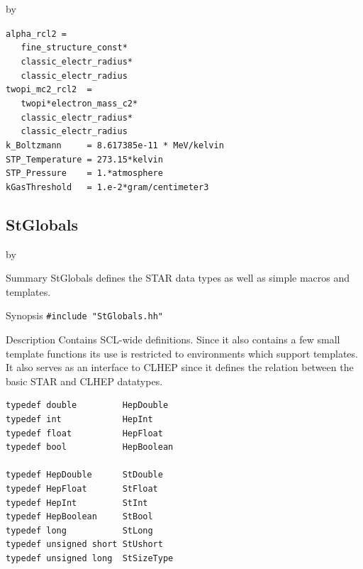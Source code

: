 \documentclass[twoside]{article}
\newcommand{\entrylabel}[1]{\mbox{\textbf{{#1}}}\hfil}%
\newenvironment{entry}
{\begin{list}{}%
    {\renewcommand{\makelabel}{\entrylabel}%
     \setlength{\labelwidth}{90pt}%
     \setlength{\leftmargin}{\labelwidth}
     \advance\leftmargin by \labelsep%
      }%
    }%
  {\end{list}}
\newcommand{\Entrylabel}[1]%
{\raisebox{0pt}[1ex][0pt]{\makebox[\labelwidth][l]%
    {\parbox[t]{\labelwidth}{\hspace{0pt}\textbf{{#1}}}}}}
\newenvironment{Entry}%
{\renewcommand{\entrylabel}{\Entrylabel}\begin{entry}}%
  {\end{entry}}
\begin{document}
\begin{description}
\begin{Entry}
  \verb+alpha_rcl2 =+ \\
  \verb+   fine_structure_const*+ \\
  \verb+   classic_electr_radius*+\\
  \verb+   classic_electr_radius+ \\ 
  \verb+twopi_mc2_rcl2  =+ \\
  \verb+   twopi*electron_mass_c2*+ \\
  \verb+   classic_electr_radius*+\\
  \verb+   classic_electr_radius+ \\
  \verb+k_Boltzmann     = 8.617385e-11 * MeV/kelvin+ \\
  \verb+STP_Temperature = 273.15*kelvin+ \\
  \verb+STP_Pressure    = 1.*atmosphere+ \\
  \verb+kGasThreshold   = 1.e-2*gram/centimeter3+ \\
\end{Entry}
\newpage

%
%

\subsection{StGlobals}
\begin{Entry}
\item[Summary]
    StGlobals defines the STAR data types as well as simple
    macros and templates.   

\item[Synopsis]
    \verb+#include "StGlobals.hh"+
    
    
\item[Description]
    Contains SCL-wide definitions. Since it also contains
    a few small template functions its use is restricted to
    environments which support templates. It also serves as an interface to
    CLHEP since it defines the relation between the basic STAR and
    CLHEP datatypes.
    
\begin{verbatim}
typedef double         HepDouble
typedef int            HepInt 
typedef float          HepFloat
typedef bool           HepBoolean

typedef HepDouble      StDouble
typedef HepFloat       StFloat
typedef HepInt         StInt
typedef HepBoolean     StBool
typedef long           StLong
typedef unsigned short StUshort
typedef unsigned long  StSizeType
\end{verbatim}


\end{Entry}
\end{description}
\end{document}
